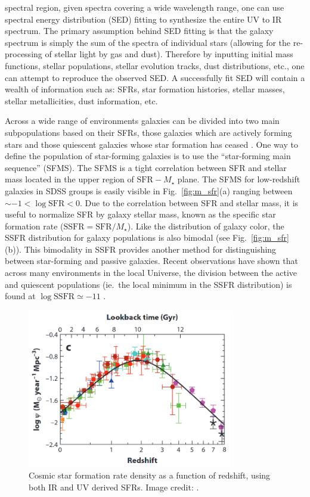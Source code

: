 spectral region, given spectra covering a wide wavelength range, one
can use spectral energy distribution (SED) fitting to synthesize the
entire UV to IR spectrum.  The primary assumption behind SED fitting
is that the galaxy spectrum is simply the sum of the spectra of
individual stars (allowing for the re-processing of stellar light by
gas and dust).  Therefore by inputting initial mass functions, stellar
populations, stellar evolution tracks, dust distributions, etc.,
one can attempt to reproduce the observed SED.  A successfully fit SED
will contain a wealth of information such as: SFRs, star formation
histories, stellar masses, stellar metallicities, dust information, etc.
\par
Across a wide range of environments galaxies
can be divided into two main subpopulations based on their SFRs, those
galaxies which are actively forming stars and those quiescent galaxies
whose star formation has ceased \citep{wetzel2012}.  One way to
define the population of star-forming galaxies is to use the
``star-forming main sequence'' (SFMS).  The SFMS is a tight
correlation between SFR and stellar mass located in the upper region
of $\mathrm{SFR} - M_\star$ plane.  The SFMS for low-redshift galaxies
in SDSS groups is easily visible in Fig.~\ref{fig:m_sfr}(a) ranging
between $\sim -1 < \log \mathrm{SFR} < 0$.  Due to the correlation
between SFR and stellar mass, it is useful to normalize SFR by galaxy
stellar mass, known as the specific star formation rate
($\mathrm{SSFR} = \mathrm{SFR}/M_\star$).  Like the distribution of
galaxy color, the SSFR distribution for galaxy populations is also
bimodal (see Fig.~\ref{fig:m_sfr}(b)).  This bimodality in SSFR
provides another method for distinguishing between star-forming and
passive galaxies.  Recent observations have shown that across
many environments in the local Universe, the division between
the active and quiescent populations (ie.\ the local minimum in the
SSFR distribution) is found at $\log \mathrm{SSFR} \simeq -11$
\citep{wetzel2012}.

\begin{figure}[!ht]
  \centering
  \includegraphics[width=0.8\textwidth]{lilly_madau.png}
  \caption{Cosmic star formation rate density as a function of
    redshift, using both IR and UV derived SFRs.  Image credit:
    \citet{madau2014}.}
  \label{fig:lilly_madau}
\end{figure}

